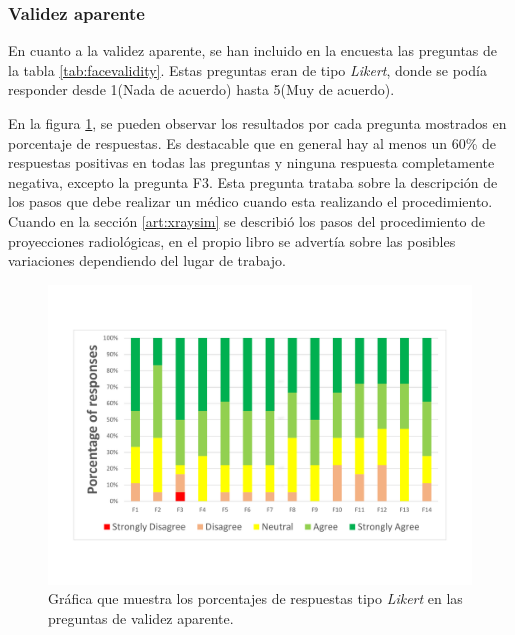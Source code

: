\subsubsection{Validez aparente}

En cuanto a la validez aparente, se han incluido en la encuesta las preguntas de la tabla \ref{tab:facevalidity}. Estas preguntas eran de tipo \emph{Likert}, donde se podía responder desde 1(Nada de acuerdo) hasta 5(Muy de acuerdo). 

En la figura \ref{fig:facevalidity}, se pueden observar los resultados por cada pregunta mostrados en porcentaje de respuestas. Es destacable que en general hay al menos un 60\% de respuestas positivas en todas las preguntas y ninguna respuesta completamente negativa, excepto la pregunta F3. Esta pregunta trataba sobre la descripción de los pasos que debe realizar un médico cuando esta realizando el procedimiento. Cuando en la sección \ref{art:xraysim} se describió los pasos del procedimiento de proyecciones radiológicas, en el propio libro \cite{manualpractico} se advertía sobre las posibles variaciones dependiendo del lugar de trabajo.  



\begin{figure}[hb]
    \centering
    \includegraphics[trim={15mm 25mm 15mm 25mm},clip,width=\linewidth]{IMG/facevalidty.pdf}
    \caption{Gráfica que muestra los porcentajes de respuestas tipo \emph{Likert} en las preguntas de validez aparente.}
    \label{fig:facevalidity}
\end{figure}


